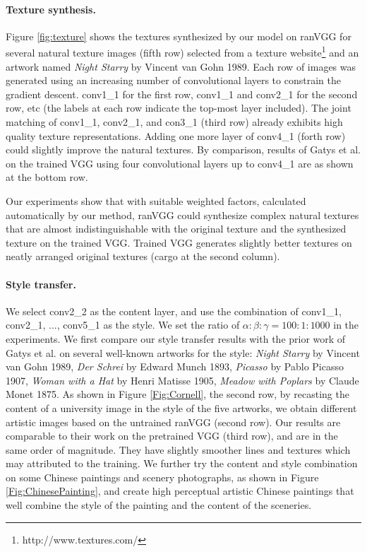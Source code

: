 \documentclass{article}
\begin{document}
\paragraph{Texture synthesis.}
Figure \ref{fig:texture} shows the textures synthesized by our model on ranVGG
for several natural texture images (fifth row) selected from a texture website\footnote{http://www.textures.com/} and an artwork named \emph{Night Starry} by Vincent van Gohn 1989.
Each row of images was generated using an increasing number of convolutional layers to constrain the gradient descent.
conv1\_1 for the first row, conv1\_1 and conv2\_1 for the second row, etc (the labels at each row indicate the top-most layer included).
The joint matching of conv1\_1, conv2\_1, and con3\_1 (third row) already exhibits high quality texture representations.
Adding one more layer of conv4\_1 (forth row) could slightly improve the natural textures.
By comparison, results of Gatys et al.\cite{Gatys2015texture} on the trained VGG using four convolutional layers up to conv4\_1 are as shown at the bottom row.

Our experiments show that with suitable weighted factors, calculated automatically by our method, %
ranVGG could synthesize complex natural textures that are almost indistinguishable with the original texture and the synthesized texture on the trained VGG.
Trained VGG generates slightly better textures on neatly arranged original textures (cargo at the second column).


\paragraph{Style transfer.}
We select conv2\_2 as the content layer, and use the combination of conv1\_1,  conv2\_1, ..., conv5\_1 as the style.
We set the ratio of $\alpha :\beta : \gamma = 100 : 1 : 1000$ in the experiments.
We first compare our style transfer results with the prior work of Gatys et al.\cite{Gatys2015Style} on several well-known artworks for the style:
\emph{Night Starry} by Vincent van Gohn 1989, \emph{Der Schrei} by Edward Munch 1893,
\emph{Picasso} by Pablo Picasso 1907, \emph{Woman with a Hat} by Henri Matisse 1905, \emph{Meadow with Poplars} by Claude Monet 1875.
As shown in Figure \ref{Fig:Cornell}, the second row, by recasting the content of a university image in the style of the five artworks,
we obtain different artistic images based on the untrained ranVGG (second row).
Our results are comparable to their work \cite{Gatys2015Style} on the pretrained VGG (third row), and are in the same order of magnitude. They have slightly smoother lines and textures which may attributed to the training.
We further try the content and style combination on some Chinese paintings and scenery photographs, as shown in Figure \ref{Fig:ChinesePainting},
and create high perceptual artistic Chinese paintings that well combine the style of the painting and the content of the sceneries.
\end{document}
